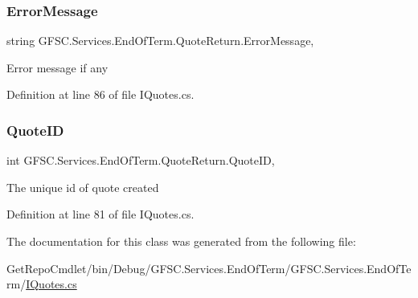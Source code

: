 \subsubsection{\texorpdfstring{Error\+Message}{ErrorMessage}}
{\footnotesize\ttfamily string G\+F\+S\+C.\+Services.\+End\+Of\+Term.\+Quote\+Return.\+Error\+Message\hspace{0.3cm}{\ttfamily [get]}, {\ttfamily [set]}}



Error message if any 



Definition at line 86 of file I\+Quotes.\+cs.

\mbox{\label{class_g_f_s_c_1_1_services_1_1_end_of_term_1_1_quote_return_a5cefff1bdb7ebaa2e4afeff992dc489c}} 
\subsubsection{\texorpdfstring{Quote\+ID}{QuoteID}}
{\footnotesize\ttfamily int G\+F\+S\+C.\+Services.\+End\+Of\+Term.\+Quote\+Return.\+Quote\+ID\hspace{0.3cm}{\ttfamily [get]}, {\ttfamily [set]}}



The unique id of quote created 



Definition at line 81 of file I\+Quotes.\+cs.



The documentation for this class was generated from the following file\+:\begin{DoxyCompactItemize}
\item 
Get\+Repo\+Cmdlet/bin/\+Debug/\+G\+F\+S\+C.\+Services.\+End\+Of\+Term/\+G\+F\+S\+C.\+Services.\+End\+Of\+Term/\mbox{\hyperlink{_i_quotes_8cs}{I\+Quotes.\+cs}}\end{DoxyCompactItemize}
